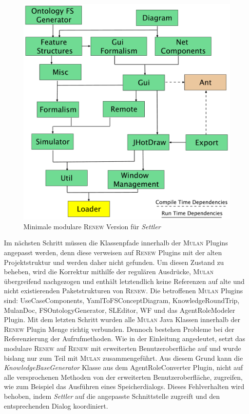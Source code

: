 	\begin{figure}[h!]
	  \centering
	  \includegraphics[width=\textwidth]{material/images/settler-renew-tree-extend.pdf}
	  \caption{Minimale modulare \textsc{Renew} Version für \textit{Settler}}
	  \label{fig:renew_mulan_plugins}
	\end{figure}	

	Im nächsten Schritt müssen die Klassenpfade innerhalb der \textsc{Mulan} Plugins angepasst werden, denn diese verweisen auf \textsc{Renew} Plugins mit der alten Projektstruktur und werden daher nicht gefunden. Um diesen Zustand zu beheben, wird die Korrektur mithilfe der regulären Ausdrücke, \textsc{Mulan} übergreifend nachgezogen und enthält letztendlich keine Referenzen auf alte und nicht existierenden Paketstrukturen von \textsc{Renew}. Die betroffenen \textsc{Mulan} Plugins sind: UseCaseComponents, YamlToFSConceptDiagram, KnowledgeRoundTrip, MulanDoc, FSOntologyGenerator, SLEditor, WF und das AgentRoleModeler Plugin. \newline
	Mit dem letzten Schritt wurden alle \textsc{Mulan} Java Klassen innerhalb der \textsc{Renew} Plugin Menge richtig verbunden. Dennoch bestehen Probleme bei der Referenzierung der Aufrufmethoden. Wie in der Einleitung angedeutet, setzt das modulare \textsc{Renew} auf \textsc{Renew} mit erweiterten Benutzeroberfläche auf und wurde bislang nur zum Teil mit \textsc{Mulan} zusammengeführt. Aus diesem Grund kann die \textit{KnowledgeBaseGenerator} Klasse aus dem AgentRoleConverter Plugin, nicht auf alle versprochenen Methoden von der erweiterten Benutzeroberfläche, zugreifen, wie zum Beispiel das Ausführen eines Speicherdialogs. Dieses Fehlverhalten wird behoben, indem \textit{Settler} auf die angepasste Schnittstelle zugreift und den entsprechenden Dialog koordiniert. \bigbreak

